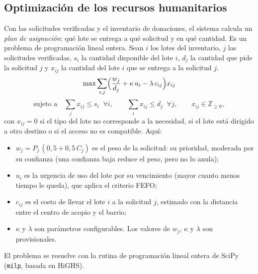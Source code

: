 \subsection{Optimización de los recursos humanitarios}\label{sec:optimizacion}
Con las solicitudes verificadas y el inventario de donaciones, el sistema calcula un \emph{plan de asignación}: qué lote se entrega a qué solicitud y en qué cantidad. Es un problema de programación lineal entera. Sean $i$ los lotes del inventario, $j$ las solicitudes verificadas, $s_i$ la cantidad disponible del lote $i$, $d_j$ la cantidad que pide la solicitud $j$ y $x_{ij}$ la cantidad del lote $i$ que se entrega a la solicitud $j$.
\begin{equation}
  \max \sum_{i,j}\Bigl(\frac{w_j}{d_j}+\kappa\,u_i-\lambda\,c_{ij}\Bigr)x_{ij}
\end{equation}
\begin{equation}
  \text{sujeto a}\quad \sum_j x_{ij}\le s_i \;\;\forall i,\qquad \sum_i x_{ij}\le d_j \;\;\forall j,\qquad x_{ij}\in\mathbb{Z}_{\ge 0},
\end{equation}
con $x_{ij}=0$ si el tipo del lote no corresponde a la necesidad, si el lote está dirigido a otro destino o si el acceso no es compatible. Aquí:
\begin{itemize}
  \item $w_j=P_j\,(0{,}5+0{,}5\,C_j)$ es el peso de la solicitud: su prioridad, moderada por su confianza (una confianza baja reduce el peso, pero no lo anula);
  \item $u_i$ es la urgencia de uso del lote por su vencimiento (mayor cuanto menos tiempo le queda), que aplica el criterio FEFO;
  \item $c_{ij}$ es el costo de llevar el lote $i$ a la solicitud $j$, estimado con la distancia entre el centro de acopio y el barrio;
  \item $\kappa$ y $\lambda$ son parámetros configurables. Los valores de $w_j$, $\kappa$ y $\lambda$ son provisionales.
\end{itemize}
El problema se resuelve con la rutina de programación lineal entera de SciPy (\texttt{milp}, basada en HiGHS).

